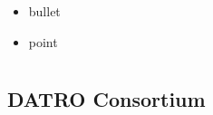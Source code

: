 \documentclass[letterpaper,10pt,openany,oneside,english]{sphinxmanual}
\begin{document}
\sphinxAtStartPar
{}
\begin{itemize}
\item {} 
\sphinxAtStartPar
bullet

\item {} 
\sphinxAtStartPar
point

\end{itemize}


\chapter{}
\label{\detokenize{index:document-author-s}}

\section{DATRO Consortium}
\label{\detokenize{index:datro-consortium}}


\renewcommand{\indexname}{Index}
\printindex
\end{document}
